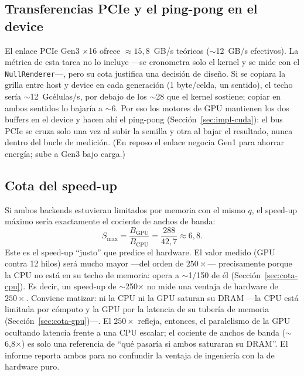 \documentclass[
	spanish,
	letterpaper, oneside
]{article}
\begin{document}
\subsection{Transferencias PCIe y el ping-pong en el device}
\label{sec:cota-pcie}

El enlace PCIe Gen3 $\times$16 ofrece $\approx 15{,}8$~GB/s teóricos
($\sim$12~GB/s efectivos). La métrica de esta tarea no lo incluye ---se cronometra
solo el kernel y se mide con el \texttt{NullRenderer}---, pero su cota justifica una
decisión de diseño. Si se copiara la grilla entre host y device en cada
generación (1 byte/celda, un sentido), el techo sería $\sim$12~Gcélulas/s, por debajo
de los $\sim$28 que el kernel sostiene; copiar en ambos sentidos lo bajaría a
$\sim$6. Por eso los motores de GPU mantienen los dos buffers en el device y
hacen ahí el ping-pong (Sección~\ref{sec:impl-cuda}): el bus PCIe se cruza solo
una vez al subir la semilla y otra al bajar el resultado, nunca dentro del bucle de
medición. (En reposo el enlace negocia Gen1 para ahorrar energía; sube a Gen3 bajo
carga.)

\subsection{Cota del speed-up}
\label{sec:cota-speedup}

Si ambos backends estuvieran limitados por memoria con el mismo $q$, el
speed-up máximo sería exactamente el cociente de anchos de banda:
%
\begin{equation}
	S_{\max} = \frac{B_{\text{GPU}}}{B_{\text{CPU}}} = \frac{288}{42{,}7} \approx 6{,}8.
	\label{eq:smax}
\end{equation}
%
Este es el speed-up ``justo'' que predice el hardware. El valor medido (GPU
contra 12 hilos) será mucho mayor ---del orden de $250\times$--- precisamente porque
la CPU no está en su techo de memoria: opera a $\sim$1/150 de él
(Sección~\ref{sec:cota-cpu}). Es decir, un speed-up de $\sim$250$\times$ no
mide una ventaja de hardware de $250\times$. Conviene matizar: ni la CPU ni la GPU
saturan su DRAM ---la CPU está limitada por cómputo y la GPU por la latencia de su
tubería de memoria (Sección~\ref{sec:cota-gpu})---. El $250\times$ refleja, entonces,
el paralelismo de la GPU ocultando latencia frente a una CPU escalar; el cociente de
anchos de banda ($\sim$6{,}8$\times$) es solo una referencia de ``qué pasaría si ambos
saturaran su DRAM''. El informe reporta ambos para no confundir la ventaja de
ingeniería con la de hardware puro.
\end{document}
